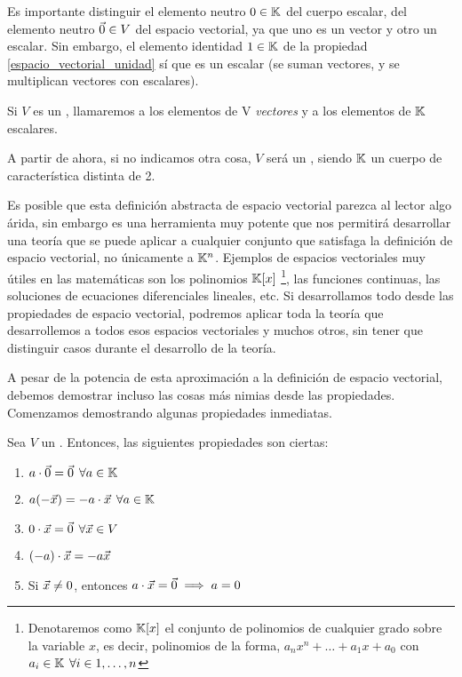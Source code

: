 \documentclass[../ecuaciones_diferenciales.tex]{subfiles}
\begin{document}
\begin{remark}
    Es importante distinguir el elemento neutro $0 \in \mathbb{K}$ del cuerpo escalar, del elemento neutro $\vec{0} \in V$ del espacio vectorial, ya que uno es un vector y otro un escalar. Sin embargo, el elemento identidad $1 \in \mathbb{K}$ de la propiedad \ref{espacio_vectorial_unidad} sí que es un escalar (se suman vectores, y se multiplican vectores con escalares).  
\end{remark}

\begin{notation}
    Si $V$ es un \kvspace, llamaremos a los elementos de V \textit{vectores} y a los elementos de $\mathbb{K}$ escalares.
\end{notation}

A partir de ahora, si no indicamos otra cosa, $V$ será un \kvspace, siendo $\mathbb{K}$ un cuerpo de característica distinta de 2.

Es posible que esta definición abstracta de espacio vectorial parezca al lector algo árida, sin embargo es una herramienta muy potente que nos permitirá desarrollar una teoría que se puede aplicar a cualquier conjunto que satisfaga la definición de espacio vectorial, no únicamente a $\mathbb{K}^n$. Ejemplos de espacios vectoriales muy útiles en las matemáticas son los polinomios $\mathbb{K}[x]$ \footnote{Denotaremos como $\mathbb{K}[x]$ el conjunto de polinomios de cualquier grado sobre la variable $x$, es decir, polinomios de la forma, $a_n x^n + \dots + a_1 x + a_0$ con $a_i \in \mathbb{K} \hspace{1.5mm} \forall i \in {1, \dots, n}$}, las funciones continuas, las soluciones de ecuaciones diferenciales lineales, etc. Si desarrollamos todo desde las propiedades de espacio vectorial, podremos aplicar toda la teoría que desarrollemos a todos esos espacios vectoriales y muchos otros, sin tener que distinguir casos durante el desarrollo de la teoría.

A pesar de la potencia de esta aproximación a la definición de espacio vectorial, debemos demostrar incluso las cosas más nimias desde las propiedades. Comenzamos demostrando algunas propiedades inmediatas.

\begin{proposition}
    Sea $V$ un \kvspace. Entonces, las siguientes propiedades son ciertas:
    \begin{enumerate}
        \item $a \cdot \vec{0} = \vec{0} \hspace{1.5mm} \forall a \in \mathbb{K}$
        \item $a(-\vec{x}) = -a\cdot \vec{x} \hspace{1.5mm} \forall a \in \mathbb{K}$
        \item $0 \cdot \vec{x} = \vec{0} \hspace{1.5mm} \forall \vec{x} \in V$
        \item \label{propiedad_cuatro_espacios_vectoriales} $(-a)\cdot \vec{x} = -a\vec{x}$
        \item Si $\vec{x} \ne 0$, entonces $a \cdot \vec{x} = \vec{0} \implies a = 0$
    \end{enumerate}
\end{proposition}
\end{document}
